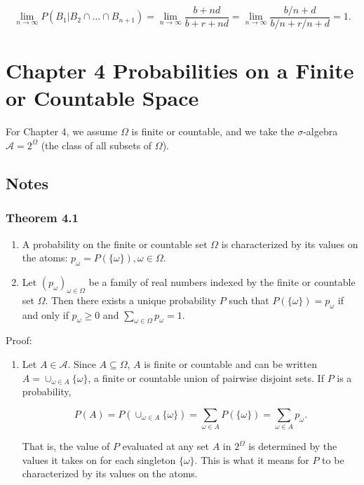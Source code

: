 \documentclass{article}
\begin{document}
{$$
\lim_{n\rightarrow \infty} P(B_1 \vert B_2 \cap \dots \cap B_{n+1}) = \lim_{n\rightarrow \infty} \frac{b+nd}{b+r + nd} = \lim_{n\rightarrow \infty} \frac{b/n+d}{b/n+r/n + d} = 1.
$$

\newpage 
\section*{Chapter 4 Probabilities on a Finite or Countable Space}

For Chapter 4, we assume $\Omega$ is finite or countable, and we take the $\sigma$-algebra $\mathcal{A} = 2^\Omega$ (the class of all subsets of $\Omega$).

\subsection*{Notes}

\subsubsection*{Theorem 4.1}

\begin{enumerate}
\item A probability on the finite or countable set $\Omega$ is characterized by its values on the atoms: $p_\omega = P(\{\omega\}), \omega \in \Omega$.

\item Let $(p_\omega)_{\omega \in \Omega}$ be a family of real numbers indexed by the finite or countable set $\Omega$. Then there exists a unique probability $P$ such that $P(\{\omega\}) = p_\omega$ if and only if $p_\omega \geq 0$ and $\sum_{\omega \in \Omega} p_\omega = 1$. \\

\end{enumerate}

Proof:

\begin{enumerate}
\item Let $A \in \mathcal{A}$. Since $A \subseteq \Omega$, $A$ is finite or countable and can be written $A = \cup_{\omega \in A} \{\omega\}$, a finite or countable union of pairwise disjoint sets. If $P$ is a probability, 

$$
P(A) = P(\cup_{\omega \in A}\{\omega\})
= \sum_{\omega \in A} P(\{\omega\})
= \sum_{\omega \in A} p_\omega .
$$

That is, the value of $P$ evaluated at any set $A$ in $2^\Omega$ is determined by the values it takes on for each singleton $\{\omega\}$. This is what it means for $P$ to be characterized by its values on the atoms.


\end{enumerate}}
\end{document}
